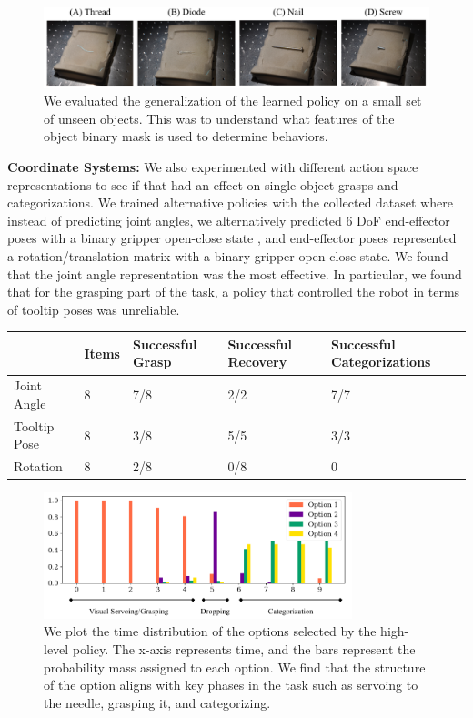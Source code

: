 \begin{figure} [ht!]
    \includegraphics[width=\textwidth]{ddco-experiments/unseen.png}
    \caption{We evaluated the generalization of the learned policy on a small set of unseen objects. This was to understand what features of the object binary mask is used to determine behaviors.\label{fig:dvrkgen}}
\end{figure}

\vspace{0.25em} \noindent \textbf{Coordinate Systems: } We also experimented with different action space representations to see if that had an effect on single object grasps and categorizations. We trained alternative policies with the collected dataset where instead of predicting joint angles, we alternatively predicted 6 DoF end-effector poses with a binary gripper open-close state , and end-effector poses represented a rotation/translation matrix with a binary gripper open-close state. 
We found that the joint angle representation was the most effective. 
In particular, we found that for the grasping part of the task, a policy that controlled the robot in terms of tooltip poses was unreliable.

\begin{table}[ht!]\footnotesize
\centering
\label{my-label}
\begin{tabular}{l|l|l|l|l|}
       & Items & Successful Grasp & Successful Recovery & Successful Categorizations \\
       \hline
Joint Angle & 8     & 7/8         & 2/2    & 7/7                         \\
Tooltip Pose  & 8     & 3/8         & 5/5    & 3/3                             \\
Rotation   & 8     & 2/8          & 0/8    & 0                     
\end{tabular}
\end{table}
\begin{figure} [ht!]
\centering
    \includegraphics[width=0.8\textwidth]{ddco-experiments/highlevel-options.png}
    \caption{We plot the time distribution of the options selected by the high-level policy. The x-axis represents time, and the bars represent the probability mass assigned to each option. We find that the structure of the option aligns with key phases in the task such as servoing to the needle, grasping it, and categorizing. \label{fig:dvrkhl}}
\end{figure}

